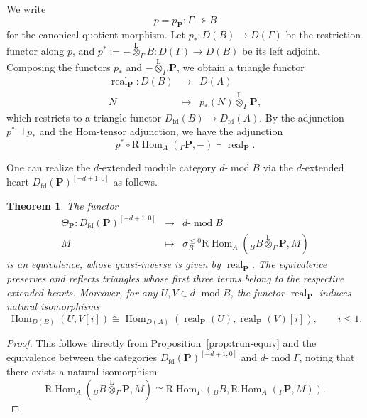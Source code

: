 \documentclass[11pt,a4paper,reqno]{amsart}
\theoremstyle{plain}
\newtheorem{theorem}{Theorem}[section]
\numberwithin{equation}{section}
\theoremstyle{definition}
\renewcommand{\mod}{\operatorname{mod}}
\newcommand{\Hom}{\operatorname{Hom}}
\newcommand{\RHom}{\mathrm R\!\Hom}
\newcommand{\real}{\operatorname{real}}
\newcommand{\Lotimes}{\overset{\mathrm L}{\otimes}}
\newcommand{\emod}[2]{#1\text{-}\!\mod #2}
\newcommand{\eheart}[2]{#2^{[-#1+1,0]}}
\newcommand{\PP}{\mathbf{P}}
\begin{document}
We write
\[
    p=p_{\PP}\colon\Gamma\twoheadrightarrow B
\]
for the canonical quotient morphism. Let $p_*\colon D(B)\to D(\Gamma)$ be the restriction functor along $p$, and $p^*:=-\Lotimes_{\Gamma}B\colon D(\Gamma)\to D(B)$ be its left adjoint. Composing the functors $p_*$ and $-\Lotimes_{\Gamma}\PP$, we obtain a triangle functor
\begin{equation}\label{eq:real}
  \begin{array}{rcl}
  \real_{\PP}\colon D(B)& \to & D(A)\\
  N &\mapsto &
      p_*(N)\overset{\mathrm L}{\otimes}_\Gamma\PP,
\end{array}
\end{equation}
which restricts to a triangle functor $D_{\mathrm{fd}}(B)\to D_{\mathrm{fd}}(A)$. By the adjunction $p^*\dashv p_*$ and the Hom-tensor adjunction, we have the adjunction
\[
p^*\circ\RHom_A({}_\Gamma\PP,-)\dashv\real_{\PP}.
\]

One can realize the $d$-extended module category $\emod{d}{B}$ via the $d$-extended heart $\eheart{d}{D_{\mathrm{fd}}(\PP)}$ as follows.

\begin{theorem}\label{thm:real-d-heart}
The functor
\[
\begin{array}{rcl}
  \Theta_{\PP}\colon\eheart{d}{D_{\mathrm{fd}}(\PP)}& \to & \emod{d}{B}\\
  M &\mapsto &
      \sigma^{\leq 0}_{B}\RHom_A({}_B B\Lotimes_\Gamma\PP,M)
\end{array}
\]
is an equivalence, whose quasi-inverse is given by $\real_{\PP}$. The equivalence preserves and reflects triangles whose first three terms belong to the respective extended hearts. Moreover, for any $U,V\in\emod{d}{B}$, the functor
$\real_{\PP}$ induces natural isomorphisms
\begin{equation}\label{eq:realization-Hom}
 \Hom_{D(B)}(U,V[i])
 \cong
 \Hom_{D(A)}
   \left(\real_{\PP}(U),\real_{\PP}(V)[i]\right),
 \qquad i\leq1.
\end{equation}
\end{theorem}

\begin{proof}
  This follows directly from Proposition~\ref{prop:trun-equiv} and the equivalence between the categories $\eheart{d}{D_{\mathrm{fd}}(\PP)}$ and $\emod{d}{\Gamma}$, noting that there exists a natural isomorphism 
  \[\RHom_A({}_B B\Lotimes_{\Gamma}\PP,M)\cong \RHom_{\Gamma}\left({}_B B,\RHom_A({}_{\Gamma}\PP,M)\right).\]
\end{proof}
\end{document}

